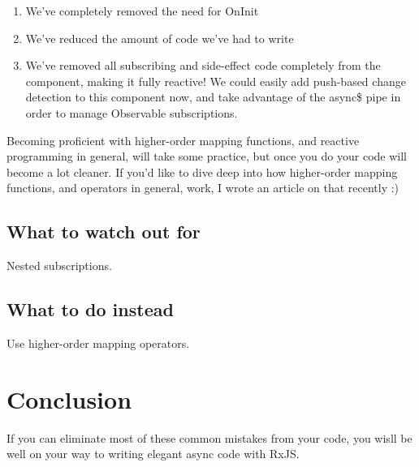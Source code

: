 \begin{enumerate}
  \item We've completely removed the need for OnInit
  \item We've reduced the amount of code we’ve had to write
  \item We've removed all subscribing and side-effect code completely from the component, making it fully reactive! We could easily add push-based change detection to this component now, and take advantage of the async\$ pipe in order to manage Observable subscriptions.
\end{enumerate}
 
Becoming proficient with higher-order mapping functions, and reactive programming in general, will take some practice, but once you do your code will become a lot cleaner. If you’d like to dive deep into how higher-order mapping functions, and operators in general, work, I wrote an article on that recently :)

\subsection{What to watch out for}
Nested subscriptions.

\subsection{What to do instead}
Use higher-order mapping operators.

\section{Conclusion}
If you can eliminate most of these common mistakes from your code, you wisll be well on your way to writing elegant async code with RxJS.